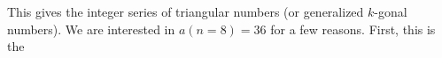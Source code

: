 \begin{enumerate}
\begin{enumerate}
   This gives the integer series of triangular numbers (or generalized $k$-gonal numbers).
   We are interested in $a(n=8)=36$ for a few reasons.
   First, this is the \cdots
   




   
   
   


\end{enumerate}
\end{enumerate}

